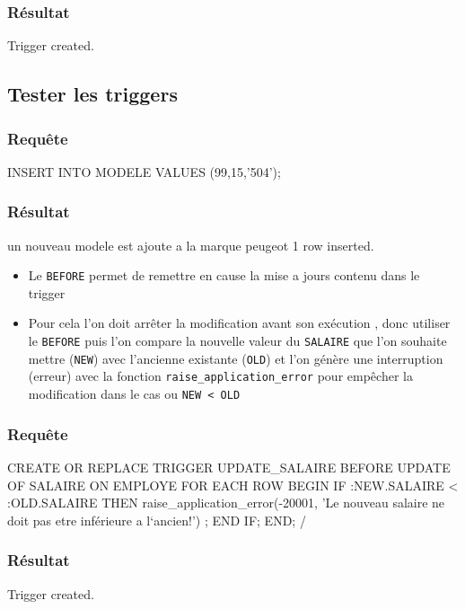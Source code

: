 \documentclass[•]{article}
\begin{document}
\subsubsection{Résultat}
\begin{sql}
Trigger created.
\end{sql}


\subsection{Tester les triggers}
\subsubsection{Requête}
\begin{sql}
INSERT INTO MODELE VALUES (99,15,'504');
\end{sql}


\subsubsection{Résultat}
\begin{sql}
un nouveau modele est ajoute a la marque peugeot
1 row inserted.
\end{sql}

\begin{itemize}
\item
Le \texttt{BEFORE} permet de remettre en cause la mise a jours contenu dans le trigger
\item
Pour cela l'on doit arrêter la modification avant son exécution , donc utiliser le \texttt{BEFORE}
puis l'on compare la nouvelle valeur du \texttt{SALAIRE} que l'on souhaite mettre (\texttt{NEW}) avec l'ancienne existante (\texttt{OLD})
et l'on génère une interruption (erreur) avec la fonction \texttt{raise\_application\_error} pour empêcher la modification dans le cas ou
\texttt{NEW < OLD}
\end{itemize}

\subsubsection{Requête}
\begin{sql}
CREATE OR REPLACE TRIGGER UPDATE_SALAIRE
BEFORE UPDATE OF SALAIRE ON EMPLOYE 
FOR EACH ROW
BEGIN
	IF :NEW.SALAIRE < :OLD.SALAIRE
	THEN raise_application_error(-20001, 'Le nouveau salaire ne doit pas etre inférieure a l`ancien!') ;
	END IF;
END;
/ 
\end{sql}
\subsubsection{Résultat}
\begin{sql}
Trigger created.
\end{sql}
\end{document}
